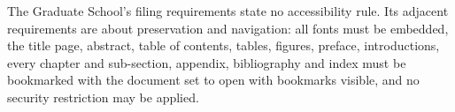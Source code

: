 
%


%
	{The Graduate School's filing requirements state no accessibility rule. Its
	 adjacent requirements are about preservation and navigation: all fonts must
	 be embedded, the title page, abstract, table of contents, tables, figures,
	 preface, introductions, every chapter and sub-section, appendix,
	 bibliography and index must be bookmarked with the document set to open
	 with bookmarks visible, and no security restriction may be applied.}

